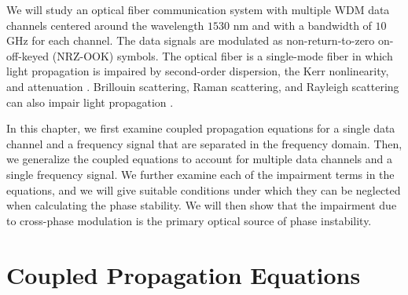 We will study an optical fiber communication system with multiple WDM data channels centered around the wavelength $1530$ nm and with a bandwidth of $10$ GHz for each channel. The data signals are modulated as non-return-to-zero on-off-keyed (NRZ-OOK) symbols. The optical fiber is a single-mode fiber in which light propagation is impaired by second-order dispersion, the Kerr nonlinearity, and attenuation \cite{agrawal2012fiber,Agrawal2013}. Brillouin scattering, Raman scattering, and Rayleigh scattering can also impair light propagation \cite{Boyd2003}.

In this chapter, we first examine coupled propagation equations for a single data channel and a frequency signal that are separated in the frequency domain. Then, we generalize the coupled equations to account for multiple data channels and a single frequency signal. We further examine each of the impairment terms in the equations, and we will give suitable conditions under which they can be neglected when calculating the phase stability. We will then show that the impairment due to cross-phase modulation is the primary optical source of phase instability.

\section{Coupled Propagation Equations} \label{sec:cnlse}

